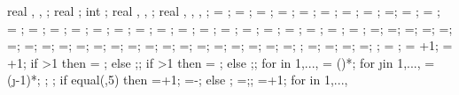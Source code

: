 {{real \shearwallstartx, \shearwallstarty \shearwalldeltax, \shearwalldeltay;
real \shearwalllinet;
int \showmarksuper;
real \marksuperexspace, \marksuperrad, \marksuperlinet;
real \marksuperleftstartx, \marksuperleftstarty, \marksuperdeltax, \marksuperdeltay;
\storyheight = \storyheight;
\baywidth = \baywidth;
\startx = \startx;
\starty = \starty;
\supportwidth = \supportwidth;
\supportheight = \supportheight;
\isolationwidth = \isolationwidth;
\isolationdepth = \isolationdepth;
\isoshift=\isoshift;
\foundationdepth = \foundationdepth;
\linet = \linet;
\beamlinet = \beamlinet;
\collinet = \collinet;
\baselinet = \baselinet;
\isolinet = \isolinet;
\massrad = \massrad;
\foundsidew = \foundsidew;
\leftsoildist = \leftsoildist;
\rightsoildist = \rightsoildist;
\leftsoildepth = \leftsoildepth;
\rightsoildepth = \rightsoildepth;
\soilbelowfound = \soilbelowfound;
\leftcontrolx = \leftcontrolx;
\leftcontroly = \leftcontroly;
\rightcontrolx = \rightcontrolx;
\rightcontroly = \rightcontroly;
\axeslenX = \axeslenX;
\axeslenY = \axeslenY;
\piledepth=\piledepth;
\pilesidespace=\pilesidespace;
\pilediameter=\pilediameter;
\pilelinethickness=\pilelinethickness;
\pblinet=\pblinet;
\latloadshift=\latloadshift;
\toparrlen=\toparrlen;
\basearrlen=\basearrlen;
\drift=\drift;
=;
=;
=;
\engbedrockdepth=\engbedrockdepth;
\engbedrockleftdist=\engbedrockleftdist;
\engbedrockrightdist=\engbedrockrightdist;
\engbedrocklinewidth=\engbedrocklinewidth;
\translayerlinet=\translayerlinet;
\ssinterlinet=\ssinterlinet;
\markssexspace=\markssexspace;
\markssrad=\markssrad;
\marksslinet=\marksslinet;
\supershadespace=\supershadespace;
\shearwalllinet=0.75pt;
\shearwalllinet=\shearwalllinet;
\marksuperexspace=\marksuperexspace;
\marksuperrad=\marksuperrad;
\marksuperlinet=\marksuperlinet;
;
\storyminone = ;
\columnnumber = \baynumber+1; %
\levelnumber = \storynumber+1; %
if \storynumber>1 then {\nlevmo = ;} else {;};
if \baynumber>1 then {\ncolmo = ;} else {;};
for \iii in {1,...,{\levelnumber}}{
\y{\iii} = ()*\storyheight;
for \j in {1,...,{\columnnumber}}{
\x{\j} = (\j-1)*\baywidth;
};
};
if equal(\showsupports,5) then
{=\subfloors+1;
\superstorynumber=\storynumber-\subfloors;}
else
{;
\superstorynumber=\storynumber;};
=+1;
for \idefl in {1,...,{}}{
}}}
